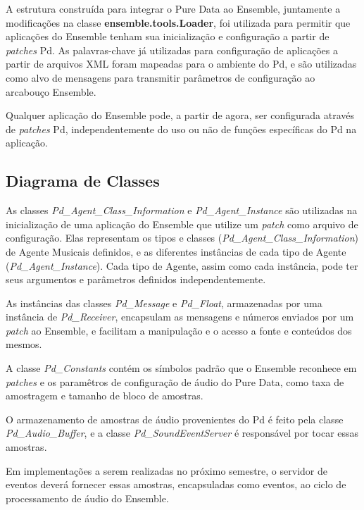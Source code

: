 \documentclass[a4paper, 11pt, twoside]{article}
\begin{document}
\begin{multicols}{2}
A estrutura construída para integrar o Pure Data ao Ensemble,
juntamente a modificações na classe \textbf{ensemble.tools.Loader}, 
foi utilizada para permitir que aplicações do Ensemble tenham sua 
inicialização e configuração a partir de \textit{patches} Pd. 
As palavras-chave já utilizadas para configuração de
aplicações a partir de arquivos XML foram mapeadas para o ambiente do Pd,
e são utilizadas como alvo de mensagens para transmitir parâmetros 
de configuração ao arcabouço Ensemble.

Qualquer aplicação do Ensemble pode, a partir de agora,  ser configurada através 
de \textit{patches} Pd, independentemente do uso ou não de funções específicas do Pd na aplicação.

\subsection{Diagrama de Classes}\label{sec:diagrama}

As classes \textit{Pd\_Agent\_Class\_Information} e \textit{Pd\_Agent\_Instance}
são utilizadas na inicialização de uma aplicação do Ensemble que utilize um
\textit{patch} como arquivo de configuração. Elas representam os tipos e classes
(\textit{Pd\_Agent\_Class\_Information}) de Agente Musicais definidos, e as
diferentes instâncias de cada tipo de Agente (\textit{Pd\_Agent\_Instance}). Cada tipo de
Agente, assim como cada instância, pode ter seus argumentos e parâmetros
definidos independentemente.

As instâncias das classes \textit{Pd\_Message} e \textit{Pd\_Float}, armazenadas
por uma instância de \textit{Pd\_Receiver}, encapsulam as mensagens e
números enviados por um \textit{patch} ao Ensemble, e facilitam a manipulação
e o acesso a fonte e conteúdos dos mesmos.

A classe \textit{Pd\_Constants} contém os símbolos padrão que o Ensemble
reconhece em \textit{patches} e os paramêtros de configuração de áudio
do Pure Data, como taxa de amostragem e tamanho de bloco de amostras.

O armazenamento de amostras de áudio provenientes do Pd é feito pela
classe \textit{Pd\_Audio\_Buffer}, e a classe \textit{Pd\_SoundEventServer}
é responsável por tocar essas amostras.

Em implementações a serem realizadas no próximo semestre, o servidor de eventos
deverá fornecer essas amostras, encapsuladas como eventos, 
ao ciclo de processamento de áudio do Ensemble.

\newpage
\end{multicols}
\end{document}
